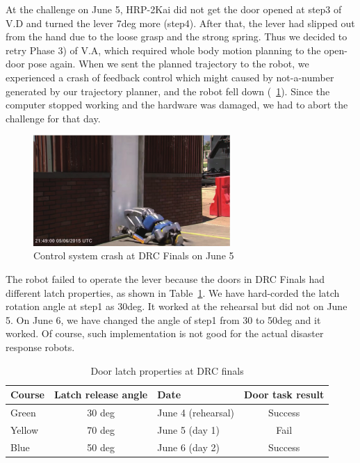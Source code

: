At the challenge on June 5, HRP-2Kai did not get the door opened at step3 of V.D and turned the lever 7deg more (step4). After that, the lever had slipped out from the hand due to the loose grasp and the strong spring. Thus we decided to retry Phase 3) of V.A, which required whole body motion planning to the open-door pose again.
When we sent the planned trajectory to the robot, we experienced a crash of feedback control which might caused by 
not-a-number generated by our trajectory planner, and the robot fell down (\figurename~\ref{fig:drc_door_aist_day1}).
Since the computer stopped working and the hardware was damaged, we had to abort the
challenge for that day. 
%
\begin{figure}[t]
  \centering
  \includegraphics[width = 7.5cm]{img/drc_door_aist_day1}
  \caption{Control system crash at DRC Finals on June 5~\cite{DARPA}}
  \label{fig:drc_door_aist_day1}
\end{figure}

The robot failed to operate the lever because the doors in DRC Finals had different
latch properties, as shown in Table~\ref{tbl:door_latch}.
We have hard-corded the latch rotation angle at step1 as 30deg. It worked at the rehearsal 
but did not on June 5. On June 6, we have changed the angle of step1 from 30 to 50deg and it worked.
Of course, such implementation is not good for the actual disaster response robots.
%
\begin{table}[htb]
\caption{Door latch properties at DRC finals} \label{tbl:door_latch}
\begin{tabular}{lclc}
\hline
Course & Latch release angle & Date & Door task result  \\ 
\hline
Green & 30 deg & June 4 (rehearsal) & Success  \\
Yellow & 70 deg & June 5 (day 1) & Fail \\
Blue &  50 deg & June 6 (day 2)  & Success \\
\hline
\end{tabular}
\end{table}


